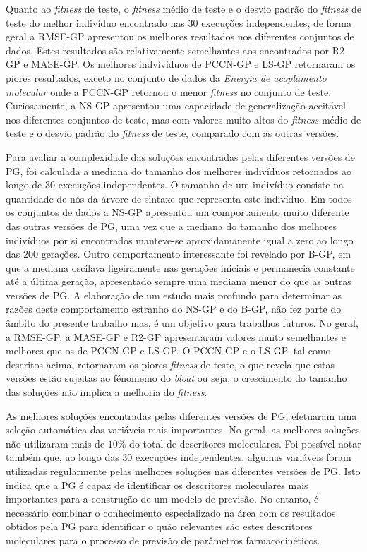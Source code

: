 Quanto ao \emph{fitness} de teste, o \emph{fitness} médio de teste e o desvio padrão do \emph{fitness} de teste do melhor indivíduo 
encontrado nas $30$ execuções independentes, de forma geral a RMSE-GP apresentou os melhores resultados nos diferentes conjuntos de dados. 
Estes resultados são relativamente semelhantes aos encontrados por R2-GP e MASE-GP. Os melhores indvíviduos
de PCCN-GP e LS-GP retornaram os piores resultados, exceto no conjunto de dados da \emph{Energia de acoplamento molecular} onde a PCCN-GP retornou 
o menor \emph{fitness} no conjunto de teste. Curiosamente, a NS-GP apresentou uma capacidade de generalização aceitável nos diferentes
conjuntos de teste, mas com valores muito altos do \emph{fitness} médio de teste e o 
desvio padrão do \emph{fitness} de teste, comparado com as outras 
versões.

Para avaliar a complexidade das soluções encontradas pelas diferentes versões de PG, foi calculada a mediana do tamanho dos 
melhores indivíduos retornados ao longo de $30$ execuções independentes. O tamanho de um indivíduo consiste na quantidade 
de nós da árvore de sintaxe que representa este indivíduo. Em todos os conjuntos de dados a NS-GP apresentou um comportamento
muito diferente das outras versões de PG, uma vez que a mediana do tamanho dos melhores indivíduos por si encontrados manteve-se
aproxidamanente igual a zero ao longo das $200$ gerações. Outro comportamento interessante foi revelado por B-GP, em que a mediana
oscilava ligeiramente nas gerações iniciais e permanecia constante até a última geração, apresentado sempre uma mediana
menor do que as outras versões de PG. A elaboração de um estudo mais profundo para determinar as razões deste comportamento estranho
do NS-GP e do B-GP, não fez parte do âmbito do presente trabalho mas, é um objetivo para trabalhos futuros. No geral, a RMSE-GP, 
a MASE-GP e R2-GP apresentaram valores muito semelhantes e melhores que os de PCCN-GP e LS-GP. O PCCN-GP e o LS-GP, tal como descritos 
acima, retornaram os piores \emph{fitness} de teste, o que revela que estas versões estão sujeitas ao fénomemo do \emph{bloat} ou
seja, o crescimento do tamanho das soluções não implica a melhoria do \emph{fitness}.

As melhores soluções encontradas pelas diferentes versões de PG, efetuaram uma seleção automática das variáveis mais importantes.
No geral, as melhores soluções não utilizaram mais de $10\%$ do total de descritores moleculares.
Foi possível notar também que, ao longo das $30$ execuções independentes, algumas variáveis foram utilizadas regularmente
pelas melhores soluções nas diferentes versões de PG. Isto indica que a \ac{PG} é capaz de identificar os descritores moleculares mais 
importantes para a construção de um modelo de previsão. No entanto, é necessário combinar o conhecimento especializado na área com os 
resultados obtidos pela \ac{PG} para identificar o quão relevantes são estes descritores moleculares para o processo de previsão de 
parâmetros farmacocinéticos. %

